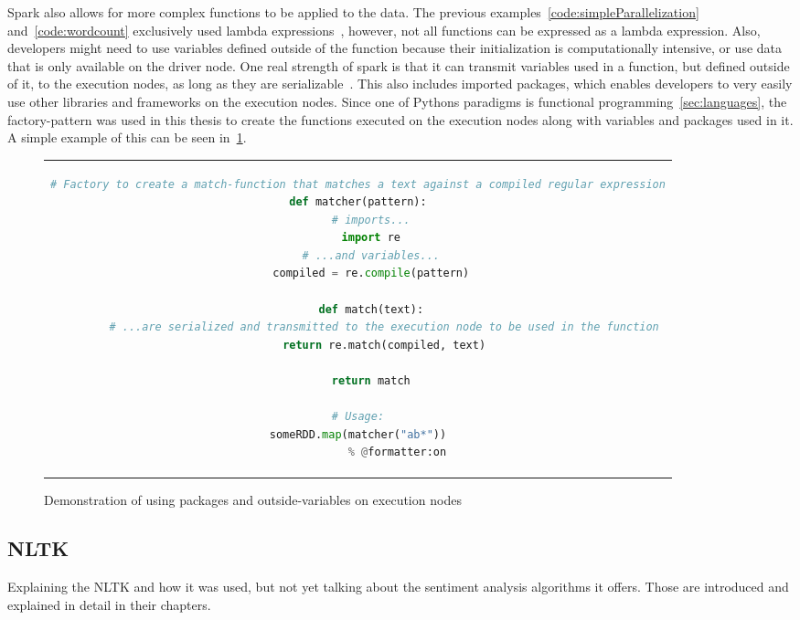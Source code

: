 Spark also allows for more complex functions to be applied to the data.
The previous examples~\ref{code:simpleParallelization} and~\ref{code:wordcount} exclusively used lambda expressions~\cite{pythonDocs},
however, not all functions can be expressed as a lambda expression.
Also, developers might need to use variables defined outside of the function because their initialization is computationally intensive,
or use data that is only available on the driver node.
One real strength of spark is that it can transmit variables used in a function, but defined outside of it, to the execution nodes, as long as they are serializable~\cite{sparkDocs}.
This also includes imported packages, which enables developers to very easily use other libraries and frameworks on the execution nodes.
Since one of Pythons paradigms is functional programming~\ref{sec:languages},
the factory-pattern was used in this thesis to create the functions executed on the execution nodes along with variables and packages used in it.
A simple example of this can be seen in~\ref{code:factory}.

\begin{figure}
    \caption{Demonstration of using packages and outside-variables on execution nodes}
    \label{code:factory}
    \begin{tabular}{c}
        \begin{lstlisting}[language=Python]
            % @formatter:off
# Factory to create a match-function that matches a text against a compiled regular expression
def matcher(pattern):
    # imports...
    import re
    # ...and variables...
    compiled = re.compile(pattern)

    def match(text):
        # ...are serialized and transmitted to the execution node to be used in the function
        return re.match(compiled, text)

    return match

# Usage:
someRDD.map(matcher("ab*"))
            % @formatter:on
        \end{lstlisting}
    \end{tabular}
\end{figure}

\subsection{NLTK}
\label{subsec:nltk}

Explaining the NLTK and how it was used, but not yet talking about the sentiment analysis algorithms it offers.
Those are introduced and explained in detail in their chapters.

